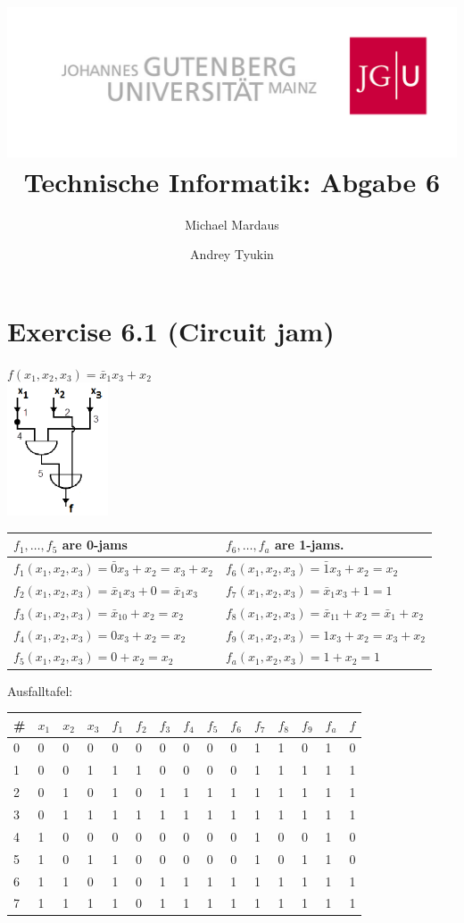\documentclass[10pt,a4paper]{scrartcl}
\author{Michael Mardaus \and Andrey Tyukin}
\title{\includegraphics[scale=0.2]{../logo_schriftzug}\\
Technische Informatik: Abgabe 6}
\begin{document}
\maketitle

\section*{Exercise 6.1 (Circuit jam)}
$f(x_1,x_2,x_3) = \bar x_1x_3+x_2$\\
\includegraphics[width=3cm]{images/circuit.png} \hspace{1.5cm}
\begin{tabular}{ll}
$f_1,\dots,f_5$ are 0-jams & $f_6,\dots,f_a$ are 1-jams.\\\hline
 $f_1(x_1,x_2,x_3) = \bar 0x_3+x_2 = x_3+x_2$ & $f_6(x_1,x_2,x_3) = \bar 1x_3+x_2 = x_2$ \\
 $f_2(x_1,x_2,x_3) = \bar x_1x_3+0 = \bar x_1x_3$ & $f_7(x_1,x_2,x_3) = \bar x_1x_3+1 = 1$ \\
 $f_3(x_1,x_2,x_3) = \bar x_10+x_2 = x_2$ & $f_8(x_1,x_2,x_3) = \bar x_11+x_2 = \bar x_1+x_2$ \\
 $f_4(x_1,x_2,x_3) =  0x_3+x_2 = x_2$ & $f_9(x_1,x_2,x_3) =  1x_3+x_2 = x_3+x_2$ \\
 $f_5(x_1,x_2,x_3) = 0+x_2 = x_2$ & $f_a(x_1,x_2,x_3) = 1+x_2 = 1$ \\
\end{tabular}

\vspace{1cm}

Ausfalltafel:
\begin{tabular}{|l||lll||l|l|l|l|l|l|l|l|l|l||l|}\hline
\# & $x_1$&$x_2$&$x_3$&$f_1$&$f_2$&$f_3$&$f_4$&$f_5$&$f_6$&$f_7$&$f_8$&$f_9$&$f_a$&$f$ \\\hline\hline
0  & 0&0&0            & 0   & 0   & 0   & 0   & 0   & 0   & 1   & 1   & 0   & 1   & 0  \\
1  & 0&0&1            & 1   & 1   & 0   & 0   & 0   & 0   & 1   & 1   & 1   & 1   & 1  \\
2  & 0&1&0            & 1   & 0   & 1   & 1   & 1   & 1   & 1   & 1   & 1   & 1   & 1  \\
3  & 0&1&1            & 1   & 1   & 1   & 1   & 1   & 1   & 1   & 1   & 1   & 1   & 1  \\
4  & 1&0&0            & 0   & 0   & 0   & 0   & 0   & 0   & 1   & 0   & 0   & 1   & 0  \\
5  & 1&0&1            & 1   & 0   & 0   & 0   & 0   & 0   & 1   & 0   & 1   & 1   & 0  \\
6  & 1&1&0            & 1   & 0   & 1   & 1   & 1   & 1   & 1   & 1   & 1   & 1   & 1  \\
7  & 1&1&1            & 1   & 0   & 1   & 1   & 1   & 1   & 1   & 1   & 1   & 1   & 1  \\\hline
\end{tabular}
\end{document}
